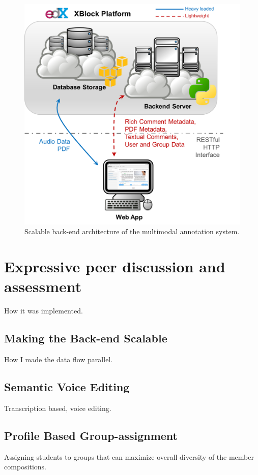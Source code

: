 \documentclass{sigchi}
\begin{document}
\begin{figure}[!h]
\centering
\includegraphics[width=0.95\columnwidth]{figure_architecture}
\caption{Scalable back-end architecture of the multimodal annotation system.}
\label{fig:figure2}
\end{figure}

\section{Expressive peer discussion and assessment} 

How it was implemented.

\subsection{Making the Back-end Scalable}
How I made the data flow parallel.

\subsection{Semantic Voice Editing}
Transcription based, voice editing.

\subsection{Profile Based Group-assignment}
Assigning students to groups that can maximize overall diversity of the member compositions.
\end{document}
